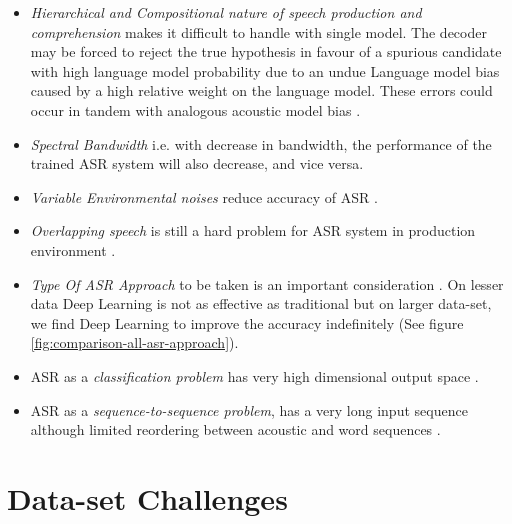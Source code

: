 \begin{itemize}
    \item \textit{Hierarchical and Compositional nature of speech production and comprehension} makes it difficult to handle with single model. The decoder may be forced to reject the true hypothesis in favour of a spurious candidate with high language model probability due to an undue Language model bias caused by a high relative weight on the language model. These errors could occur in tandem with analogous acoustic model bias \cite{backstrom_introduction_2022}.     
    \item \textit{Spectral Bandwidth} i.e. with decrease in bandwidth, the performance of the trained ASR system will also decrease, and vice versa.
    \item \textit{Variable Environmental noises} reduce accuracy of ASR \cite{misra_spectral_2004}.
    \item \textit{Overlapping speech} is still a hard problem for ASR system in production environment \cite{chen_progressive_2018}.
    \item \textit{Type Of ASR Approach} to be taken is an important consideration \cite{georgescu_performance_2021}. On lesser data Deep Learning is not as effective as traditional but on larger data-set, we find Deep Learning to improve the accuracy indefinitely (See figure \ref{fig:comparison-all-asr-approach}). 
    \item ASR as a \textit{classification problem} has very high dimensional output space \cite{jurafsky_speech_2009}. 
    \item ASR as a \textit{sequence-to-sequence problem}, has a very long input sequence although limited reordering between acoustic and word sequences \cite{jurafsky_speech_2009}.
\end{itemize}

\section{Data-set Challenges}
\label{sub:data-set-asr_difficult}

